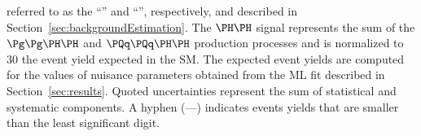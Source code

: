 \begin{table}[!h]
{  referred to as the ``\threeLeptonCR'' and ``\fourLeptonCR'', respectively, and described in Section~\ref{sec:backgroundEstimation}.
  The $\HH$ signal represents the sum of the $\ggHH$ and $\qqHH$ production processes and is normalized to $30$ the event yield expected in the SM.
  The expected event yields are computed for the values of nuisance parameters obtained from the ML fit described in Section~\ref{sec:results}.
  Quoted uncertainties represent the sum of statistical and systematic components. 
  A hyphen (—) indicates events yields that are smaller than the least significant digit.
}
\label{tab:event_yields}
\end{table}

